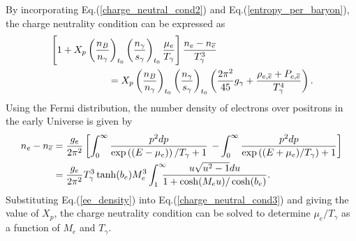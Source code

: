 By incorporating Eq.(\ref{charge_neutral_cond2}) and Eq.(\ref{entropy_per_baryon}), the charge neutrality condition can be expressed as
\begin{align}\label{charge_neutral_cond3}
&\left[1+X_p\left(\frac{n_B}{n_\gamma}\right)_{t_0}\left(\frac{n_\gamma}{s_{\gamma}}\right)_{t_0}\frac{\mu_e}{T_\gamma}\right]\frac{n_e-n_{\overline{e}}}{T_\gamma^3}\notag\\
&\qquad\qquad\qquad=X_p\left(\frac{n_B}{n_\gamma}\right)_{t_0}\left(\frac{n_\gamma}{s_{\gamma}}\right)_{t_0} \left(\frac{2\pi^2}{45}g_\gamma+\frac{\rho_{e,\overline{e}}+P_{e,\overline{e}}}{T_\gamma^4}\right).
\end{align}
Using the Fermi distribution, the number density of electrons over positrons in the early Universe is given by
\begin{align}\label{ee_density}
n_e-n_{\overline{e}}&=\frac{g_e}{2\pi^2}\left[\int_0^\infty\frac{p^2dp}{\exp{\left((E-\mu_e)\right)/T_\gamma}+1}\right.\left.-\int_0^\infty\frac{p^2dp}{\exp{\left((E+\mu_e)/T_\gamma\right)}+1}\right]\notag\\
&=\frac{g_e}{2\pi^2}{T_\gamma^3}\tanh(b_e)M_e^3\int_{1}^\infty \!\!\!\!\frac{  u \sqrt{u^2-1} du}{1+\cosh(M_eu)/\cosh(b_e)}.
\end{align}
Substituting Eq.(\ref{ee_density}) into Eq.(\ref{charge_neutral_cond3}) and giving the value of $X_p$, the charge neutrality condition can be solved to determine $\mu_e/T_\gamma$ as a function of $M_e$ and $T_\gamma$. 
